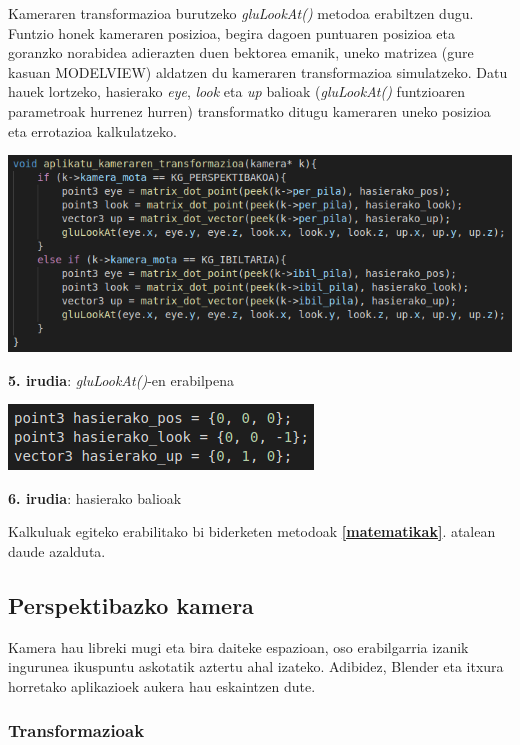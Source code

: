 \documentclass[12pt]{article}
\newcommand{\metodo}[1] {\textit{#1}}
\newcommand{\aldagai}[1] {\textit{#1}}
\newcommand{\erref}[1] {\textbf{\ref{#1}}}
\begin{document}
Kameraren transformazioa burutzeko \metodo{gluLookAt()}\cite{glu_lookat} metodoa erabiltzen dugu. Funtzio honek kameraren posizioa, begira dagoen puntuaren posizioa eta goranzko norabidea adierazten duen bektorea emanik, uneko matrizea (gure kasuan MODELVIEW) aldatzen du kameraren transformazioa simulatzeko. Datu hauek lortzeko, hasierako \aldagai{eye}, \aldagai{look} eta \aldagai{up} balioak (\metodo{gluLookAt()} funtzioaren parametroak hurrenez hurren) transformatko ditugu kameraren uneko posizioa eta errotazioa kalkulatzeko.

\begin{center}
\includegraphics[scale=0.6]{kamera_lookat.png}

\textbf{5. irudia}: \metodo{gluLookAt()}-en erabilpena
\end{center}

\begin{center}
\includegraphics[scale=0.65]{kamera_hasierako_balioak.png}

\textbf{6. irudia}: hasierako balioak
\end{center}

Kalkuluak egiteko erabilitako bi biderketen metodoak \erref{matematikak}. atalean daude azalduta.


\subsection{Perspektibazko kamera}

Kamera hau libreki mugi eta bira daiteke espazioan, oso erabilgarria izanik ingurunea ikuspuntu askotatik aztertu ahal izateko. Adibidez, Blender\cite{blender} eta itxura horretako aplikazioek aukera hau eskaintzen dute.

\subsubsection{Transformazioak}
\end{document}
